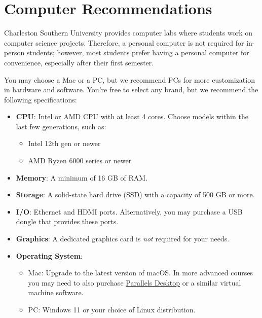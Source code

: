 \section{Computer Recommendations}
Charleston Southern University provides computer labs where students work on computer science projects. Therefore, a personal computer is not required for in-person students; however, most students prefer having a personal computer for convenience, especially after their first semester.

\vspace{1em}
You may choose a Mac or a PC, but we recommend PCs for more customization in hardware and software. You're free to select any brand, but we recommend the following specifications:

\begin{itemize}
    \item
        \textbf{CPU}: Intel or AMD CPU with at least 4 cores. Choose models within the last few generations, such as:
        \begin{itemize}
            \item Intel 12th gen or newer
            \item AMD Ryzen 6000 series or newer
        \end{itemize}
    \item
        \textbf{Memory}: A minimum of 16 GB of RAM\@.
    \item
        \textbf{Storage}: A solid-state hard drive (SSD) with a capacity of 500 GB or more.
    \item
        \textbf{I/O}: Ethernet and HDMI ports. Alternatively, you may purchase a USB dongle that provides these ports.
    \item
        \textbf{Graphics}: A dedicated graphics card is \emph{not} required for your needs.
    \item
        \textbf{Operating System}:
        \begin{itemize}
            \item {Mac}: Upgrade to the latest version of macOS\@. In more advanced courses you may need to also purchase \href{https://www.parallels.com/products/desktop/}{Parallels Desktop} or a similar virtual machine software.
            \item {PC}: Windows 11 or your choice of Linux distribution.
        \end{itemize}
\end{itemize}